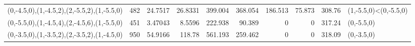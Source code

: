 \begin{tabular}{lrrrrrrrrl}
 (0,-4.5,0),(1,-4.5,2),(2,-5.5,2),(1,-5.5,0) &      482   &                          24.7517  &                        26.8331  &                           399.004 &                         368.054 &                           186.513 &                          75.873 &     308.76 & (1,-5.5,0)<(0,-5.5,0)            \\
 (0,-5.5,0),(1,-4.5,4),(2,-4.5,6),(1,-5.5,0) &      451   &                           3.47043 &                         8.5596  &                           222.938 &                          90.389 &                             0     &                           0     &     317.24 & (0,-5.5,0)                       \\
 (0,-3.5,0),(1,-3.5,2),(2,-3.5,2),(1,-4.5,0) &      950   &                          54.9166  &                       118.78    &                           561.193 &                         259.462 &                             0     &                           0     &     318.09 & (0,-3.5,0)                       \\
\hline
\end{tabular}